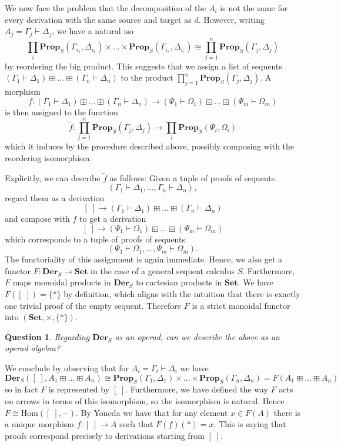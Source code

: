 \documentclass[12pt]{article}
\theoremstyle{definition}
\theoremstyle{plain}
\theoremstyle{plain}
\theoremstyle{plain}
\theoremstyle{plain}
\newtheorem{question}{Question}[section]
\theoremstyle{remark}
\theoremstyle{remark}
\newcommand{\Hom}{\text{Hom}}
\begin{document}
We now face the problem that the decomposition of the $A_i$ is not the same for every derivation with the same source and target as $d$. However, writing $A_j = \Gamma_{j} \vdash \Delta_{j}$, we have a natural iso
$$\prod_i \mathbf{Prop}_S(\Gamma_{i_1},\Delta_{i_1}) \times \ldots \times  \mathbf{Prop}_S(\Gamma_{i_r},\Delta_{i_r}) \cong \prod_{j=1}^n \mathbf{Prop}_S(\Gamma_{j},\Delta_{j})$$
by reordering the big product. This suggests that we assign a list of sequents $(\Gamma_{1} \vdash \Delta_{1}) \boxplus \ldots \boxplus (\Gamma_{n} \vdash \Delta_{n})$ to the product $\prod_{j=1}^n \mathbf{Prop}_S(\Gamma_{j},\Delta_{j})$. A morphism 
$$f: (\Gamma_{1} \vdash \Delta_{1}) \boxplus \ldots \boxplus (\Gamma_{n} \vdash \Delta_{n}) \rightarrow (\Psi_{1} \vdash \Omega_{1}) \boxplus \ldots \boxplus (\Psi_{m} \vdash \Omega_{m})$$
is then assigned to the function
$$\tilde f: \prod_{j=1}^n \mathbf{Prop}_S(\Gamma_{j},\Delta_{j}) \rightarrow \prod_i \mathbf{Prop}_S(\Psi_i, \Omega_i)$$
which it induces by the procedure described above, possibly composing with the reordering isomorphism. 

Explicitly, we can describe $\tilde f$ as follows: Given a tuple of proofs of sequents $$ (\Gamma_{1} \vdash \Delta_{1}, \ldots, \Gamma_{n} \vdash \Delta_{n}), $$ regard them as a derivation $$[\;] \rightarrow (\Gamma_{1} \vdash \Delta_{1}) \boxplus \ldots \boxplus (\Gamma_{n} \vdash \Delta_{n})$$ and compose with $f$ to get a derivation $$[\:] \rightarrow  (\Psi_{1} \vdash \Omega_{1}) \boxplus \ldots \boxplus (\Psi_{m} \vdash \Omega_{m})$$ which corresponds to a tuple of proofs of sequents $$(\Psi_1 \vdash \Omega_{1}, \ldots, \Psi_{m} \vdash \Omega_{m}).$$ The functoriality of this assignment is again immediate. Hence, we also get a functor $F: \mathbf{Der}_S \rightarrow \mathbf{Set}$ in the case of a general sequent calculus $S$. Furthermore, $F$ maps monoidal products in $\mathbf{Der}_S$ to cartesian products in $\mathbf{Set}$. We have $F([\;]) = \{*\}$ by definition, which aligns with the intuition that there is exactly one trivial proof of the empty sequent. Therefore $F$ is a strict monoidal functor into $(\mathbf{Set},\times,\{*\})$.

\begin{question}
	Regarding $\mathbf{Der}_S$ as an operad, can we describe the above as an operad algebra?
\end{question}

We conclude by observing that for $A_i = \Gamma_{i} \vdash \Delta_{i}$ we have 
$$\mathbf{Der}_S([\;],A_1 \boxplus \ldots \boxplus A_n) \cong  \mathbf{Prop}_S(\Gamma_{1}, \Delta_{1}) \times \ldots \times \mathbf{Prop}_S(\Gamma_{n}, \Delta_{n}) = F(A_1 \boxplus \ldots \boxplus A_n)$$
so in fact $F$ is represented by $[\;]$. Furthermore, we have defined the way $F$ acts on arrows in terms of this isomorphism, so the isomorphism is natural. Hence $F \cong \Hom([\;], -)$. By Yoneda we have that for any element $x \in F(A)$ there is a unique morphism $f: [\;] \rightarrow A$ such that $F(f)(*) = x$. This is saying that proofs correspond precisely to derivations starting from $[\;]$.
\end{document}
